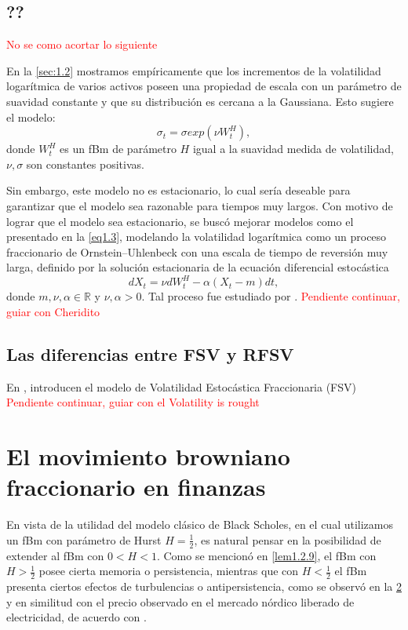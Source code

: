 \documentclass[letterpaper,12pt,oneside]{book}
\theoremstyle{plain}
\numberwithin{theorem}{section}
\begin{document}
\section{??}
\textcolor{red}{No se como acortar lo siguiente}

En la \cref{sec:1.2} mostramos empíricamente que los incrementos de la volatilidad logarítmica de varios activos poseen una propiedad de escala con un parámetro de suavidad constante y que su distribución es cercana a la Gaussiana. Esto sugiere el modelo:
$$\sigma_t=\sigma exp\left(\nu W^H_t\right),$$
donde $W^H_t$ es un fBm de parámetro $H$ igual a la suavidad medida de volatilidad, $\nu,\sigma$ son constantes positivas.

Sin embargo, este modelo no es estacionario, lo cual sería deseable para garantizar que el modelo sea razonable para tiempos muy largos. Con motivo de lograr que el modelo sea estacionario, se buscó mejorar modelos como el presentado en la \cref{eq1.3}, modelando la volatilidad logarítmica como un proceso fraccionario de Ornstein–Uhlenbeck con una escala de tiempo de reversión muy larga, definido por la solución estacionaria de la ecuación diferencial estocástica
$$dX_t=\nu dW^H_t-\alpha(X_t-m)dt,$$
donde $m,\nu,\alpha\in\mathbb R$ y $\nu,\alpha>0$. Tal proceso fue estudiado por \cite{cheridito_fractional_2003}.
\textcolor{red}{Pendiente continuar, guiar con Cheridito}
\section{Las diferencias entre FSV y RFSV}\label{sec:2.4}
En \cite{comte_long_1998}, introducen el modelo de Volatilidad Estocástica Fraccionaria (FSV)
\textcolor{red}{Pendiente continuar, guiar con el Volatility is rought}
\chapter{El movimiento browniano fraccionario en finanzas}\label{ch:3}
En vista de la utilidad del modelo clásico de Black Scholes, en el cual utilizamos un fBm con parámetro de Hurst $H=\frac{1}{2}$, es natural pensar en la posibilidad de extender al fBm con $0<H<1$. Como se mencionó en \cref{lem1.2.9}, el fBm con $H>\frac{1}{2}$ posee cierta memoria o persistencia, mientras que con $H<\frac{1}{2}$ el fBm presenta ciertos efectos de turbulencias o antipersistencia, como se observó en la \ref{sec:2.4} y en similitud con el precio observado en el mercado nórdico liberado de electricidad, de acuerdo con \cite{simonsen_measuring_2003}.
\end{document}
